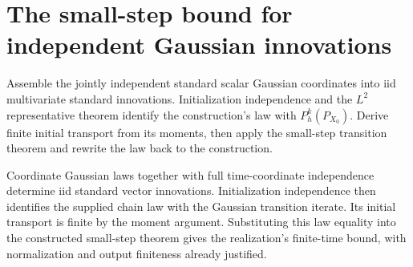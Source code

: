\documentclass[11pt,a4paper]{article}
\begin{document}
\section{\texorpdfstring{The small-step bound for independent Gaussian innovations}{The small-step bound for independent Gaussian innovations}}


Assemble the jointly independent standard scalar Gaussian coordinates into iid multivariate standard innovations. Initialization independence and the \(L^2\) representative theorem identify the construction's law with \(P_h^k(P_{X_0})\). Derive finite initial transport from its moments, then apply the small-step transition theorem and rewrite the law back to the construction.



Coordinate Gaussian laws together with full time-coordinate independence determine iid standard vector innovations. Initialization independence then identifies the supplied chain law with the Gaussian transition iterate. Its initial transport is finite by the moment argument. Substituting this law equality into the constructed small-step theorem gives the realization's finite-time bound, with normalization and output finiteness already justified.
\end{document}

